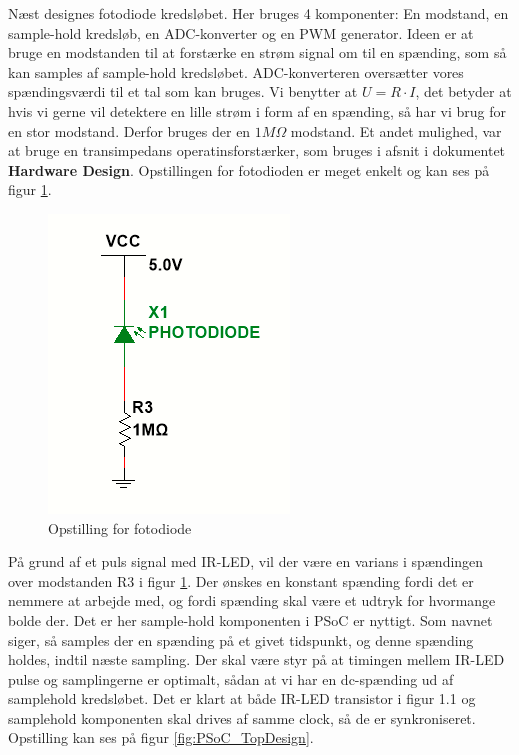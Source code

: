 Næst designes fotodiode kredsløbet. Her bruges 4 komponenter: En modstand, en sample-hold kredsløb, en ADC-konverter og en PWM generator. Ideen er at bruge en modstanden til at forstærke en strøm signal om til en spænding, som så kan samples af sample-hold kredsløbet. ADC-konverteren oversætter vores spændingsværdi til et tal som kan bruges.
Vi benytter at $U=R\cdot I$, det betyder at hvis vi gerne vil detektere en lille strøm i form af en spænding, så har vi brug for en stor modstand. Derfor bruges der en $1M\Omega$ modstand. Et andet mulighed, var at bruge en transimpedans operatinsforstærker, som bruges i afsnit  i dokumentet \textbf{Hardware Design}. Opstillingen for fotodioden er meget enkelt og kan ses på figur \ref{fig:fotodiode_opstilling}.
\begin{figure}[H]
    \centering
    \includegraphics{Rapport/BallDispenser/BallCountSensor/graphics/Opstilling1_2.png}
    \caption{Opstilling for fotodiode}
    \label{fig:fotodiode_opstilling}
\end{figure}
På grund af et puls signal med IR-LED, vil der være en varians i spændingen over modstanden R3 i figur \ref{fig:fotodiode_opstilling}. Der ønskes en konstant spænding fordi det er nemmere at arbejde med, og fordi spænding skal være et udtryk for hvormange bolde der. Det er her sample-hold komponenten i PSoC er nyttigt. Som navnet siger, så samples der en spænding på et givet tidspunkt, og denne spænding holdes, indtil næste sampling. Der skal være styr på at timingen mellem IR-LED pulse og samplingerne er optimalt, sådan at vi har en dc-spænding ud af samplehold kredsløbet. Det er klart at både IR-LED transistor i figur 1.1 og samplehold komponenten skal drives af samme clock, så de er synkroniseret. Opstilling kan ses på  figur \ref{fig:PSoC_TopDesign}.
